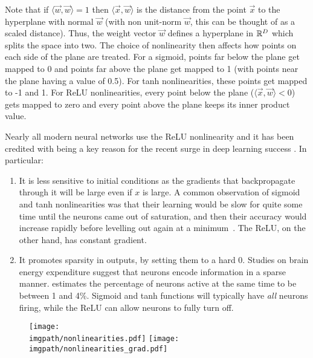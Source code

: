 Note that if $\langle\vec{w}, \vec{w}\rangle = 1$ then $\langle\vec{x},
\vec{w}\rangle$ is the distance from the point $\vec{x}$ to the hyperplane with
normal $\vec{w}$ (with non unit-norm $\vec{w}$, this can be thought of as a scaled
distance). Thus, the weight vector $\vec{w}$ defines a hyperplane in $\reals[D]$
which splits the space into two. The choice of nonlinearity then affects how
points on each side of the plane are treated. For a sigmoid, points far below
the plane get mapped to 0 and points far above the plane get mapped to 1 (with
points near the plane having a value of 0.5). For tanh nonlinearities, these
points get mapped to -1 and 1. For ReLU nonlinearities, every point below the
plane ($\langle\vec{x}, \vec{w}\rangle < 0$) gets mapped to zero and every point
above the plane keeps its inner product value.

Nearly all modern neural networks use the ReLU nonlinearity and it has
been credited with being a key reason for the recent surge in deep learning
success \cite{glorot_deep_2011, nair_rectified_2010}. In particular:
\begin{enumerate}
\item It is less sensitive to initial conditions as the gradients that
  backpropagate through it will be large even if $x$ is large. A common
  observation of sigmoid and tanh nonlinearities was that their learning would
  be slow for quite some time until the neurons came out of saturation, and then
  their accuracy would increase rapidly before levelling out again at
  a minimum~\cite{glorot_understanding_2010}. The ReLU, on the other hand, has
  constant gradient.
\item It promotes sparsity in outputs, by setting them to a hard 0. Studies
  on brain energy expenditure suggest that neurons encode information in
  a sparse manner. \cite{lennie_cost_2003} estimates the percentage of
  neurons active at the same time to be between 1 and 4\%. Sigmoid and tanh
  functions will typically have \emph{all} neurons firing, while
  the ReLU can allow neurons to fully turn off.
\end{enumerate}

\begin{figure}
    \qquad
    \texttt{[image: \\imgpath/nonlinearities.pdf]}
    \quad
    \texttt{[image: \\imgpath/nonlinearities\_grad.pdf]}
  \centering
  \label{fig:ch2:nonlinearities}
\end{figure}

